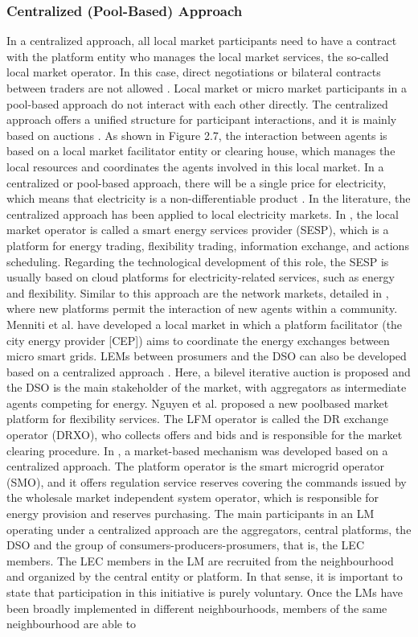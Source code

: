 \subsubsection{Centralized (Pool-Based) Approach}
In a centralized approach, all local market participants need to have a contract with the platform entity who manages the local market services, the so-called local market operator. In this case, direct negotiations or bilateral contracts between traders are not allowed \cite{DesignElectricityMarketRossetoo2017}. Local market or micro market participants in a pool-based approach do not interact with each other directly. The centralized approach offers a unified structure for participant interactions, and it is mainly based on auctions \cite{vytelingum2010trading}. As shown in Figure 2.7, the interaction between agents is based on a local market facilitator entity or clearing house, which manages the local resources and coordinates the agents involved in this local market. In a centralized or pool-based approach, there will be a single price for electricity, which means that electricity is a non-differentiable product \cite{Pinson2017}. In the literature, the centralized approach has been applied to local electricity markets. In \cite{ilieva2016design}, the local market operator is called a smart energy services provider (SESP), which is a platform for energy trading, flexibility trading, information exchange, and actions scheduling. Regarding the technological development of this role, the SESP is usually based on cloud platforms for electricity-related services, such as energy and flexibility. Similar to this approach are the network markets, detailed in \cite{parker2016platform}, where new platforms permit the interaction of new agents within a community. Menniti et al. \cite{menniti2014future} have developed a local market in which a platform facilitator (the city energy provider [CEP]) aims to coordinate the energy exchanges between micro smart grids. LEMs between prosumers and the DSO can also be developed based on a centralized approach \cite{faqiry2017distributed}. Here, a bilevel iterative auction is proposed and the DSO is the main stakeholder of the market, with aggregators as intermediate agents competing for energy. Nguyen et al. \cite{nguyen2010pool} proposed a new poolbased market platform for flexibility services. The LFM operator is called the DR exchange operator (DRXO), who collects offers and bids and is responsible for the market clearing procedure. In \cite{paschalidis2012demand}, a market-based mechanism was developed based on a centralized approach. The platform operator is the smart microgrid operator (SMO), and it offers regulation service reserves covering the commands issued by the wholesale market independent system operator, which is responsible for energy provision and reserves purchasing. The main participants in an LM operating under a centralized approach are the aggregators, central platforms, the DSO and the group of consumers-producers-prosumers, that is, the LEC members. The LEC members in the LM are recruited from the neighbourhood and organized by the central entity or platform. In that sense, it is important to state that participation in this initiative is purely voluntary. Once the LMs have been broadly implemented in different neighbourhoods, members of the same neighbourhood are able to

